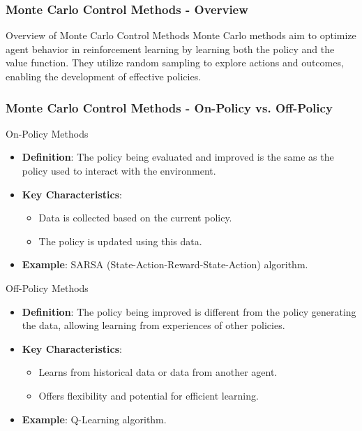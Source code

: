 \documentclass[aspectratio=169]{beamer}
\begin{document}
\begin{frame}[fragile]
    \frametitle{Monte Carlo Control Methods - Overview}
    \begin{block}{Overview of Monte Carlo Control Methods}
        Monte Carlo methods aim to optimize agent behavior in reinforcement learning by learning both the policy and the value function. They utilize random sampling to explore actions and outcomes, enabling the development of effective policies.
    \end{block}
\end{frame}

\begin{frame}[fragile]
    \frametitle{Monte Carlo Control Methods - On-Policy vs. Off-Policy}
    \begin{block}{On-Policy Methods}
        \begin{itemize}
            \item \textbf{Definition}: The policy being evaluated and improved is the same as the policy used to interact with the environment.
            \item \textbf{Key Characteristics}:
                \begin{itemize}
                    \item Data is collected based on the current policy.
                    \item The policy is updated using this data.
                \end{itemize}
            \item \textbf{Example}: SARSA (State-Action-Reward-State-Action) algorithm.
        \end{itemize}
    \end{block}
    
    \begin{block}{Off-Policy Methods}
        \begin{itemize}
            \item \textbf{Definition}: The policy being improved is different from the policy generating the data, allowing learning from experiences of other policies.
            \item \textbf{Key Characteristics}:
                \begin{itemize}
                    \item Learns from historical data or data from another agent.
                    \item Offers flexibility and potential for efficient learning.
                \end{itemize}
            \item \textbf{Example}: Q-Learning algorithm.
        \end{itemize}
    \end{block}
\end{frame}
\end{document}
